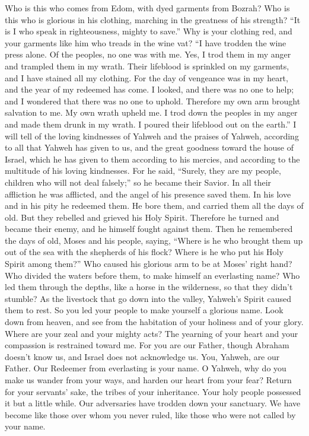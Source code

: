  Who is this who comes from Edom, with dyed garments from
Bozrah? Who is this who is glorious in his clothing, marching in the
greatness of his strength? ``It is I who speak in righteousness, mighty
to save.''  Why is your clothing red, and your garments like
him who treads in the wine vat?  ``I have trodden the wine
press alone. Of the peoples, no one was with me. Yes, I trod them in my
anger and trampled them in my wrath. Their lifeblood is sprinkled on my
garments, and I have stained all my clothing.  For the day
of vengeance was in my heart, and the year of my redeemed has come.
 I looked, and there was no one to help; and I wondered that
there was no one to uphold. Therefore my own arm brought salvation to
me. My own wrath upheld me.  I trod down the peoples in my
anger and made them drunk in my wrath. I poured their lifeblood out on
the earth.''  I will tell of the loving kindnesses of Yahweh
and the praises of Yahweh, according to all that Yahweh has given to us,
and the great goodness toward the house of Israel, which he has given to
them according to his mercies, and according to the multitude of his
loving kindnesses.  For he said, ``Surely, they are my
people, children who will not deal falsely;'' so he became their Savior.
 In all their affliction he was afflicted, and the angel of
his presence saved them. In his love and in his pity he redeemed them.
He bore them, and carried them all the days of old.  But
they rebelled and grieved his Holy Spirit. Therefore he turned and
became their enemy, and he himself fought against them. 
Then he remembered the days of old, Moses and his people, saying,
``Where is he who brought them up out of the sea with the shepherds of
his flock? Where is he who put his Holy Spirit among them?''
 Who caused his glorious arm to be at Moses' right hand?
Who divided the waters before them, to make himself an everlasting name?
 Who led them through the depths, like a horse in the
wilderness, so that they didn't stumble?  As the livestock
that go down into the valley, Yahweh's Spirit caused them to rest. So
you led your people to make yourself a glorious name.  Look
down from heaven, and see from the habitation of your holiness and of
your glory. Where are your zeal and your mighty acts? The yearning of
your heart and your compassion is restrained toward me. 
For you are our Father, though Abraham doesn't know us, and Israel does
not acknowledge us. You, Yahweh, are our Father. Our Redeemer from
everlasting is your name.  O Yahweh, why do you make us
wander from your ways, and harden our heart from your fear? Return for
your servants' sake, the tribes of your inheritance.  Your
holy people possessed it but a little while. Our adversaries have
trodden down your sanctuary.  We have become like those
over whom you never ruled, like those who were not called by your name.

